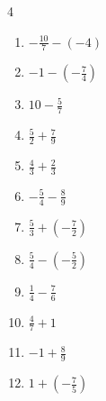 \begin{multicols}{4}
\begin{enumerate}
  \item $\displaystyle -\frac{10}{7} - \left(-4\right)$


  \item $\displaystyle -1 - \left(-\frac{7}{4}\right)$


\columnbreak %

  \item $\displaystyle 10 - \frac{5}{7}$


  \item $\displaystyle \frac{5}{2} + \frac{7}{9}$


  \item $\displaystyle \frac{4}{3} + \frac{2}{3}$

        \phantom{$\displaystyle =2$}

  \item $\displaystyle -\frac{5}{4} - \frac{8}{9}$


  \item $\displaystyle \frac{5}{3} + \left(-\frac{7}{2}\right)$


  \item $\displaystyle \frac{5}{4} - \left(-\frac{5}{2}\right)$


  \item $\displaystyle \frac{1}{4} - \frac{7}{6}$


  \item $\displaystyle \frac{4}{7} + 1$


  \item $\displaystyle -1 + \frac{8}{9}$


  \item $\displaystyle 1 + \left(-\frac{7}{5}\right)$


\end{enumerate}
\end{multicols}
